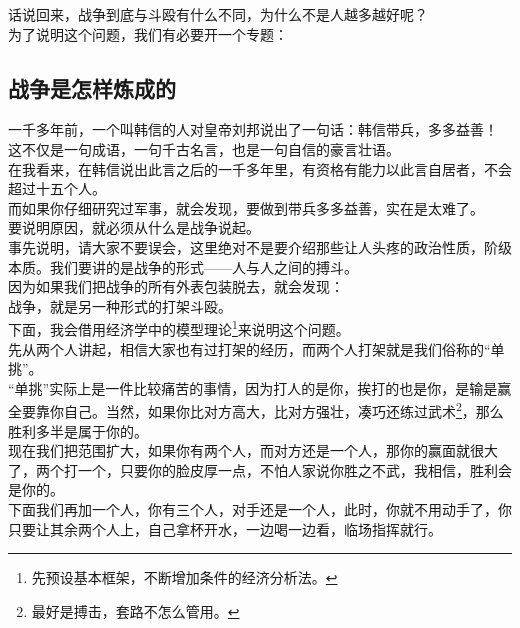 \begin{multicols}{\theparacolNo}
话说回来，战争到底与斗殴有什么不同，为什么不是人越多越好呢？\\

为了说明这个问题，我们有必要开一个专题：\\

\subsection{战争是怎样炼成的}
一千多年前，一个叫韩信的人对皇帝刘邦说出了一句话：韩信带兵，多多益善！\\

这不仅是一句成语，一句千古名言，也是一句自信的豪言壮语。\\

在我看来，在韩信说出此言之后的一千多年里，有资格有能力以此言自居者，不会超过十五个人。\\

而如果你仔细研究过军事，就会发现，要做到带兵多多益善，实在是太难了。\\

要说明原因，就必须从什么是战争说起。\\

事先说明，请大家不要误会，这里绝对不是要介绍那些让人头疼的政治性质，阶级本质。我们要讲的是战争的形式——人与人之间的搏斗。\\

因为如果我们把战争的所有外表包装脱去，就会发现：\\

战争，就是另一种形式的打架斗殴。\\

下面，我会借用经济学中的模型理论\footnote{先预设基本框架，不断增加条件的经济分析法。}来说明这个问题。\\

先从两个人讲起，相信大家也有过打架的经历，而两个人打架就是我们俗称的“单挑”。\\

“单挑”实际上是一件比较痛苦的事情，因为打人的是你，挨打的也是你，是输是赢全要靠你自己。当然，如果你比对方高大，比对方强壮，凑巧还练过武术\footnote{最好是搏击，套路不怎么管用。}，那么胜利多半是属于你的。\\

现在我们把范围扩大，如果你有两个人，而对方还是一个人，那你的赢面就很大了，两个打一个，只要你的脸皮厚一点，不怕人家说你胜之不武，我相信，胜利会是你的。\\

下面我们再加一个人，你有三个人，对手还是一个人，此时，你就不用动手了，你只要让其余两个人上，自己拿杯开水，一边喝一边看，临场指挥就行。\\


\end{multicols}
